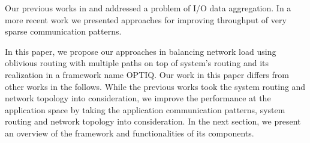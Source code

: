 Our previous works in \cite{Vishwanath:GLEAN} and \cite{SDAV:Bui2014b} addressed a problem of I/O data aggregation. In a more recent work \cite{hbui:bgq} we presented approaches for improving throughput of very sparse communication patterns.

In this paper, we propose our approaches in balancing network load using oblivious routing with multiple paths on top of system's routing and its realization in a framework name OPTIQ. Our work in this paper differs from other works in the follows. While the previous works took the system routing and network topology into consideration, we improve the performance at the application space by taking the application communication patterns, system routing and network topology into consideration. In the next section, we present an overview of the framework and functionalities of its components.

